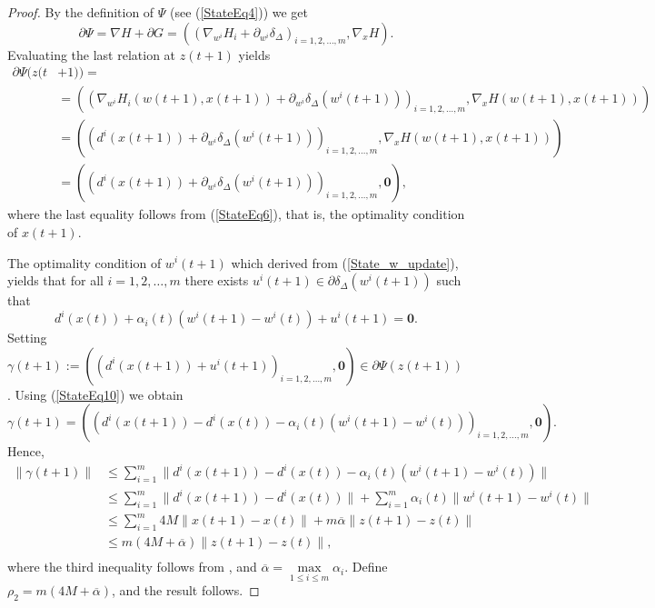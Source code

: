 \documentclass[11pt]{article}
\numberwithin{equation}{section}
\begin{document}
\begin{proof}
By the definition of $\Psi$ (see (\ref{StateEq4})) we get
\begin{equation*}
	\partial \Psi = \nabla H + \partial G  
= \left( \left( \nabla_{w^i} H_i + \partial_{w^i} \delta_{\Delta} \right)_{i=1,2, \ldots ,m} , \nabla_x H \right) .
\end{equation*}
Evaluating the last relation at $z(t+1)$ yields
\begin{equation*}
\begin{aligned}
	\partial \Psi(z(t & + 1)) = \\
	& = \left( \left( \nabla_{w^i} H_i(w(t+1),x(t+1)) + \partial_{w^i} \delta_{\Delta}(w^i(t+1)) \right)_{i=1,2, \ldots ,m} , \nabla_x H(w(t+1),x(t+1)) \right) \\
	& = \left( \left( d^i(x(t+1)) + \partial_{w^i} \delta_{\Delta}(w^i(t+1)) \right)_{i=1,2, \ldots ,m} , \nabla_x H(w(t+1),x(t+1)) \right) \\
	& = \left( \left( d^i(x(t+1)) + \partial_{w^i} \delta_{\Delta}(w^i(t+1)) \right)_{i=1,2, \ldots ,m} , \mathbf{0} \right) ,
\end{aligned}
\end{equation*}
where the last equality follows from (\ref{StateEq6}), that is, the optimality condition of $x(t+1)$.

The optimality condition of $w^i(t+1)$ which derived from (\ref{State_w_update}), yields that for all $i=1, 2, \ldots ,m$ there exists $u^i(t+1) \in \partial \delta_{\Delta}(w^i(t+1))$ such that
\begin{equation}
	d^i(x(t)) + \alpha_i(t) \left( w^i(t+1) - w^i(t) \right) + u^i(t+1) = \mathbf{0} . \label{StateEq10}
\end{equation}
Setting $\gamma(t+1) := \left( \left( d^i(x(t+1)) + u^i(t+1) \right)_{i=1,2, \ldots ,m}, \mathbf{0} \right) \in \partial \Psi(z(t+1))$. Using (\ref{StateEq10}) we obtain
\begin{equation*}
	\gamma(t+1) = \left( \left( d^i(x(t+1)) - d^i(x(t)) - \alpha_i(t)(w^i(t+1) - w^i(t)) \right)_{i=1,2, \ldots, m}, \mathbf{0} \right).
\end{equation*}
Hence,
\begin{equation*}
\begin{aligned}
	\| \gamma(t+1) \|
	& \leq \sum\limits_{i=1}^{m} \| d^i(x(t+1)) - d^i(x(t)) - \alpha_i(t) \left( w^i(t+1) - w^i(t) \right) \| \\
	& \leq \sum\limits_{i=1}^{m} \| d^i(x(t+1)) - d^i(x(t)) \| + \sum\limits_{i=1}^{m} \alpha_i(t) \| w^i(t+1) - w^i(t) \| \\
	& \leq \sum\limits_{i=1}^{m} 4M \| x(t+1) - x(t) \| + m \overline{\alpha} \|z(t+1) - z(t)\| \\
	& \leq m \left( 4M + \overline{\alpha} \right) \|z(t+1) - z(t)\| , \\
\end{aligned}
\end{equation*}
where the third inequality follows from , and $\overline{\alpha} = \max\limits_{1 \leq i \leq m} \alpha_i$. Define $\rho_2 = m \left( 4M + \overline{\alpha} \right)$, and the result follows.
\end{proof}
\end{document}
